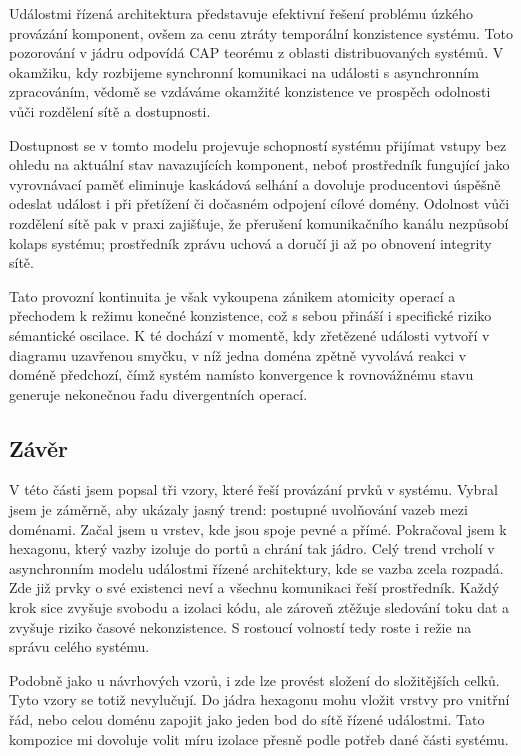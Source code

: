\documentclass[FM,DP,fonts]{tulthesis}
\begin{document}
Událostmi řízená architektura představuje efektivní řešení problému úzkého provázání komponent, ovšem za cenu ztráty temporální konzistence systému. Toto pozorování v jádru odpovídá CAP teorému z oblasti distribuovaných systémů. V okamžiku, kdy rozbijeme synchronní komunikaci na události s asynchronním zpracováním, vědomě se vzdáváme okamžité konzistence ve prospěch odolnosti vůči rozdělení sítě a dostupnosti.
\clearpage

Dostupnost se v tomto modelu projevuje schopností systému přijímat vstupy bez ohledu na aktuální stav navazujících komponent, neboť prostředník fungující jako vyrovnávací paměť eliminuje kaskádová selhání a dovoluje producentovi úspěšně odeslat událost i při přetížení či dočasném odpojení cílové domény. Odolnost vůči rozdělení sítě pak v praxi zajišťuje, že přerušení komunikačního kanálu nezpůsobí kolaps systému; prostředník zprávu uchová a doručí ji až po obnovení integrity sítě.

Tato provozní kontinuita je však vykoupena zánikem atomicity operací a přechodem k režimu konečné konzistence, což s sebou přináší i specifické riziko sémantické oscilace. K té dochází v momentě, kdy zřetězené události vytvoří v diagramu uzavřenou smyčku, v níž jedna doména zpětně vyvolává reakci v doméně předchozí, čímž systém namísto konvergence k rovnovážnému stavu generuje nekonečnou řadu divergentních operací.

\subsection{Závěr}
V této části jsem popsal tři vzory, které řeší provázání prvků v systému. Vybral jsem je záměrně, aby ukázaly jasný trend: postupné uvolňování vazeb mezi doménami. Začal jsem u vrstev, kde jsou spoje pevné a přímé. Pokračoval jsem k hexagonu, který vazby izoluje do portů a chrání tak jádro. Celý trend vrcholí v asynchronním modelu událostmi řízené architektury, kde se vazba zcela rozpadá. Zde již prvky o své existenci neví a všechnu komunikaci řeší prostředník. Každý krok sice zvyšuje svobodu a izolaci kódu, ale zároveň ztěžuje sledování toku dat a zvyšuje riziko časové nekonzistence. S rostoucí volností tedy roste i režie na správu celého systému.

Podobně jako u návrhových vzorů, i zde lze provést složení do složitějších celků. Tyto vzory se totiž nevylučují. Do jádra hexagonu mohu vložit vrstvy pro vnitřní řád, nebo celou doménu zapojit jako jeden bod do sítě řízené událostmi. Tato kompozice mi dovoluje volit míru izolace přesně podle potřeb dané části systému.
\end{document}
